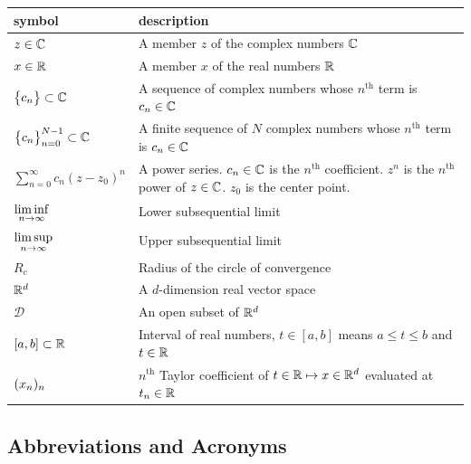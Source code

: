 \documentclass[12pt]{article}
\begin{document}
\renewcommand{\arraystretch}{1.2}
\noindent \begin{longtable*}{l p{12cm}} \toprule
\textbf{symbol} & \textbf{description}\\
\midrule
  $z \in \mathbb{C}$ & A member $z$ of the complex numbers $\mathbb{C}$\\
  $x \in \mathbb{R}$ & A member $x$ of the real numbers $\mathbb{R}$\\
  $\bigl\{ {c_n} \bigr\} \subset \mathbb{C}$ & A sequence of complex numbers
  whose $n^\text{th}$ term is $c_n \in \mathbb{C}$\\
  $\bigl\{ {c_n} \bigr\}_{n=0}^{N-1} \subset \mathbb{C}$ & A finite sequence of $N$ complex numbers
  whose $n^\text{th}$ term is $c_n \in \mathbb{C}$\\
  $\sum_{n=0}^{\infty} c_n (z-z_0)^n$ & A power series. $c_n \in \mathbb{C}$ is the
  $n^\text{th}$ coefficient. $z^n$ is the $n^\text{th}$ power of $z \in \mathbb{C}$. $z_0$ is the center point.\\ 
  $\liminf\limits_{{n} \rightarrow \infty}$ & Lower subsequential limit\\
  $\limsup\limits_{{n} \rightarrow \infty}$ & Upper subsequential limit\\
  $R_c$ & Radius of the circle of convergence\\
  $\mathbb{R}^d$ & A $d$-dimension real vector space\\
  $\mathcal D$ & An open subset of $\mathbb{R}^d$\\
  $[a,b] \subset \mathbb{R}$ & Interval of real numbers, $t \in [a,b]$ means $a \leq t \leq b$ and $t \in \mathbb{R}$\\
  $(x_{n})_{n}$ & $n^\text{th}$ Taylor coefficient of $t \in \mathbb{R} \mapsto x \in \mathbb{R}^d$ evaluated at $t_n \in \mathbb{R}$\\
\bottomrule
\end{longtable*}

\subsection{Abbreviations and Acronyms}
\end{document}
